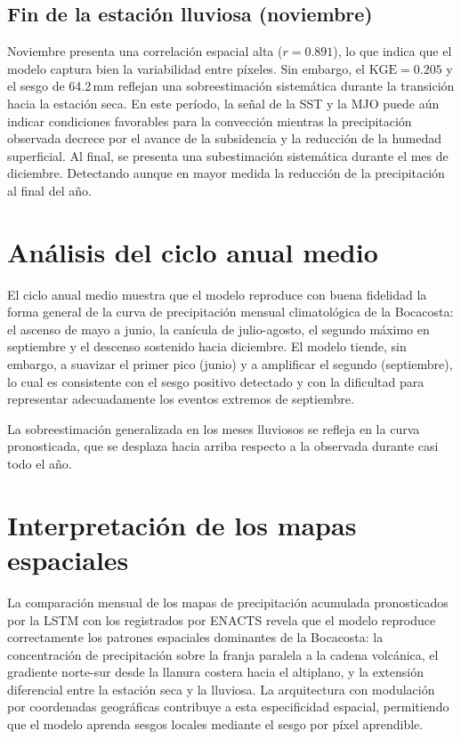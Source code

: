 \subsection*{Fin de la estación lluviosa (noviembre)}

Noviembre presenta una correlación espacial alta ($r = 0.891$), lo que indica que el
modelo captura bien la variabilidad entre píxeles. Sin embargo, el $\text{KGE} = 0.205$
y el sesgo de 64.2\,mm reflejan una sobreestimación sistemática durante la transición
hacia la estación seca. En este período, la señal de la SST y la MJO puede aún indicar
condiciones favorables para la convección mientras la precipitación observada decrece
por el avance de la subsidencia y la reducción de la humedad superficial. Al final,
se presenta una subestimación sistemática durante el mes de diciembre. Detectando aunque
en mayor medida la reducción de la precipitación al final del año.

\section{Análisis del ciclo anual medio}

El ciclo anual medio muestra que el modelo reproduce con buena fidelidad
la forma general de la curva de precipitación mensual climatológica de la Bocacosta: el
ascenso de mayo a junio, la canícula de julio-agosto, el segundo máximo en septiembre y
el descenso sostenido hacia diciembre. El modelo tiende, sin embargo, a suavizar el
primer pico (junio) y a amplificar el segundo (septiembre), lo cual es consistente con
el sesgo positivo detectado y con la dificultad para representar adecuadamente los
eventos extremos de septiembre.

La sobreestimación generalizada en los meses lluviosos se refleja en la curva
pronosticada, que se desplaza hacia arriba respecto a la observada durante casi todo el
año.

\section{Interpretación de los mapas espaciales}

La comparación mensual de los mapas de precipitación acumulada pronosticados por la
LSTM con los registrados por ENACTS revela que el modelo reproduce correctamente los
patrones espaciales dominantes de la Bocacosta: la concentración de precipitación sobre
la franja paralela a la cadena volcánica, el gradiente norte-sur desde la llanura
costera hacia el altiplano, y la extensión diferencial entre la estación seca y la
lluviosa. La arquitectura con modulación por coordenadas geográficas
contribuye a esta especificidad espacial, permitiendo que el modelo aprenda sesgos
locales mediante el sesgo por píxel aprendible.

